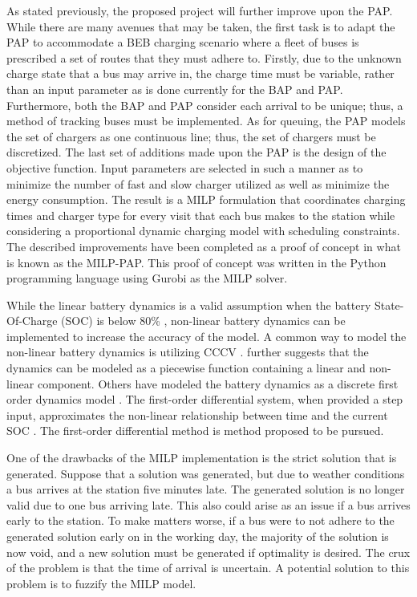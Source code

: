 \documentclass[11pt,a4paper,final]{article}
\begin{document}
As stated previously, the proposed project will further improve upon the PAP. While there are many avenues that may be
taken, the first task is to adapt the PAP to accommodate a BEB charging scenario where a fleet of buses is prescribed a
set of routes that they must adhere to. Firstly, due to the unknown charge state that a bus may arrive in, the charge
time must be variable, rather than an input parameter as is done currently for the BAP and PAP. Furthermore, both the
BAP and PAP consider each arrival to be unique; thus, a method of tracking buses must be implemented. As for queuing,
the PAP models the set of chargers as one continuous line; thus, the set of chargers must be discretized. The last set
of additions made upon the PAP is the design of the objective function. Input parameters are selected in such a manner
as to minimize the number of fast and slow charger utilized as well as minimize the energy consumption. The result is a
MILP formulation that coordinates charging times and charger type for every visit that each bus makes to the station
while considering a proportional dynamic charging model with scheduling constraints. The described improvements have
been completed as a proof of concept in what is known as the MILP-PAP. This proof of concept was written in the Python
programming language using Gurobi as the MILP solver.

While the linear battery dynamics is a valid assumption when the battery State-Of-Charge (SOC) is below 80\%
\cite{liu-2020-batter-elect}, non-linear battery dynamics can be implemented to increase the accuracy of the model. A
common way to model the non-linear battery dynamics is utilizing CCCV \cite{abdollahi-2016-optim-batter,chen-2008-desig-grey}. \cite{zhang-2021-optim-elect} further suggests that the dynamics can be modeled as a piecewise
function containing a linear and non-linear component. Others have modeled the battery dynamics as a discrete first
order dynamics model \cite{whitaker-2022-a-network}. The first-order differential system, when provided a step input,
approximates the non-linear relationship between time and the current SOC \cite{whitaker-2022-a-network}. The
first-order differential method is method proposed to be pursued.

One of the drawbacks of the MILP implementation is the strict solution that is generated. Suppose that a solution was
generated, but due to weather conditions a bus arrives at the station five minutes late. The generated solution is no
longer valid due to one bus arriving late. This also could arise as an issue if a bus arrives early to the station. To
make matters worse, if a bus were to not adhere to the generated solution early on in the working day, the majority of
the solution is now void, and a new solution must be generated if optimality is desired. The crux of the problem is that
the time of arrival is uncertain. A potential solution to this problem is to fuzzify the MILP model.
\end{document}
